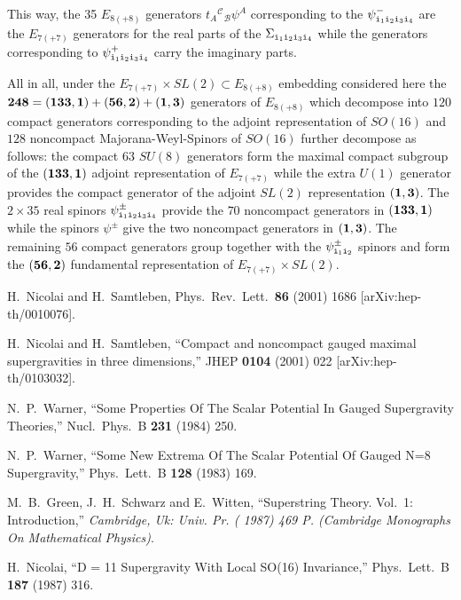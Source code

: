 \documentclass[a4paper,12pt]{article}
\begin{document}
This way, the 35 $E_{8(+8)}$ generators
$t_{A}{}^{\mathcal{C}}{}_{\mathcal{B}}\psi^A$ corresponding to the
$\psi^-_{{\tt i}_1 {\tt i}_2 {\tt i}_3 {\tt i}_4}$ are the $E_{7(+7)}$ generators for
the real parts of the $\Sigma_{{\tt i}_1 {\tt i}_2 {\tt i}_3 {\tt i}_4}$ while the generators
corresponding to $\psi^+_{{\tt i}_1 {\tt i}_2 {\tt i}_3 {\tt i}_4}$ carry the
imaginary parts.

All in all, under the $E_{7(+7)}\times SL(2)\subset E_{8(+8)}$
embedding considered here the ${\bf 248}=({\bf 133},{\bf 1})+({\bf
56},{\bf 2})+({\bf 1},{\bf 3})$ generators of $E_{8(+8)}$ which
decompose into $120$ compact generators corresponding to the adjoint
representation of $SO(16)$ and $128$ noncompact Majorana-Weyl-Spinors
of $SO(16)$ further decompose as follows: the compact $63$ $SU(8)$
generators form the maximal compact subgroup of the $({\bf 133},{\bf 1})$ adjoint
representation of $E_{7(+7)}$ while the extra $U(1)$ generator
provides the compact generator of the adjoint $SL(2)$ representation
$({\bf 1},{\bf 3})$. The $2\times 35$ real spinors $\psi^{\pm}_{{\tt i}_1 {\tt
i}_2 {\tt i}_3 {\tt i}_4}$ provide the $70$ noncompact generators in
$({\bf 133},{\bf 1})$ while the spinors $\psi^{\pm}_{}$ give the two noncompact
generators in $({\bf 1},{\bf 3})$. The remaining $56$ compact generators group
together with the $\psi^\pm_{{\tt i}_1 {\tt i}_2}$ spinors and form the
$({\bf 56},{\bf 2})$ fundamental representation of $E_{7(+7)}\times SL(2)$.

\newpage

\begingroup\raggedright\begin{thebibliography}{10}

H.~Nicolai and H.~Samtleben,
Phys.\ Rev.\ Lett.\  {\bf 86} (2001) 1686
[arXiv:hep-th/0010076].

H.~Nicolai and H.~Samtleben,
``Compact and noncompact gauged maximal supergravities in three  dimensions,''
JHEP {\bf 0104} (2001) 022
[arXiv:hep-th/0103032].

N.~P.~Warner,
``Some Properties Of The Scalar Potential In Gauged Supergravity Theories,''
Nucl.\ Phys.\ B {\bf 231} (1984) 250.

N.~P.~Warner,
``Some New Extrema Of The Scalar Potential Of Gauged N=8 Supergravity,''
Phys.\ Lett.\ B {\bf 128} (1983) 169.

M.~B.~Green, J.~H.~Schwarz and E.~Witten,
``Superstring Theory. Vol.~1: Introduction,''
{\it  Cambridge, Uk: Univ. Pr. ( 1987) 469 P. (Cambridge Monographs On Mathematical Physics)}.

H.~Nicolai,
``D = 11 Supergravity With Local SO(16) Invariance,''
Phys.\ Lett.\ B {\bf 187} (1987) 316.

\end{thebibliography}\endgroup
\end{document}
